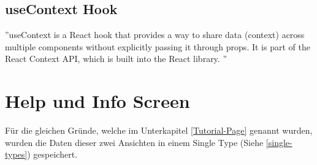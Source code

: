 \subsection{useContext Hook}
''useContext is a React hook that provides a way to share data (context)
across multiple components without explicitly passing it through props.
It is part of the React Context API, which is built into the React library.
'' \cite{useContext}






\section{Help und Info Screen}

Für die gleichen Gründe, welche im Unterkapitel \ref{Tutorial-Page} genannt wurden, wurden die Daten dieser zwei Ansichten in einem Single Type (Siehe  \ref{single-types}) gespeichert.


